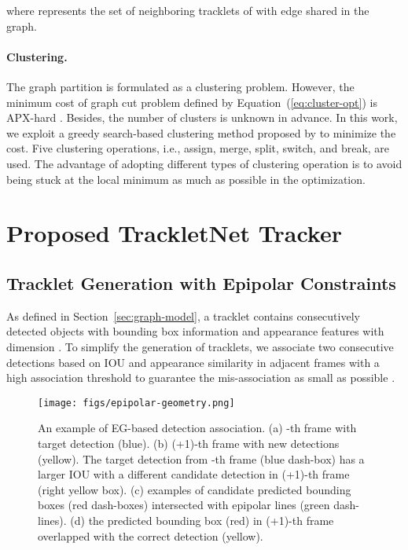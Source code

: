 \documentclass[10pt,twocolumn,letterpaper]{article}
\begin{document}
where  represents the set of neighboring tracklets of  with edge shared in the graph.

\paragraph{Clustering.} 
The graph partition is formulated as a clustering problem. However, the minimum cost of graph cut problem defined by Equation~(\ref{eq:cluster-opt}) is APX-hard \cite{papadimitriou1991optimization}. 
Besides, the number of clusters is unknown in advance. 
In this work, we exploit a greedy search-based clustering method proposed by \cite{tang2018single} to minimize the cost. Five clustering operations, i.e., assign, merge, split, switch, and break, are used. The advantage of adopting different types of clustering operation is to avoid being stuck at the local minimum as much as possible in the optimization. 


\section{Proposed TrackletNet Tracker} 


\subsection{Tracklet Generation with Epipolar Constraints}
\label{sec:epi-constri}

As defined in Section~\ref{sec:graph-model}, a tracklet contains consecutively detected objects with bounding box information and appearance features with dimension . To simplify the generation of tracklets, we associate two consecutive detections based on IOU and appearance similarity in adjacent frames with a high association threshold to guarantee the mis-association as small as possible \cite{zhang2017multi,wang2016closed}. 






\begin{figure}
\begin{center}
\texttt{[image: figs/epipolar-geometry.png]}
\end{center}
   \caption{An example of EG-based detection association. 
   (a) -th frame with target detection (blue). 
   (b) (+1)-th frame with new detections (yellow).
The target detection from -th frame (blue dash-box) has a larger IOU with a different candidate detection in (+1)-th frame (right yellow box). 
   (c) examples of candidate predicted bounding boxes (red dash-boxes) intersected with epipolar lines (green dash-lines). 
   (d) the predicted bounding box (red) in (+1)-th frame overlapped with the correct detection (yellow). }
\label{fig:epi-geo}
\end{figure}
\end{document}
